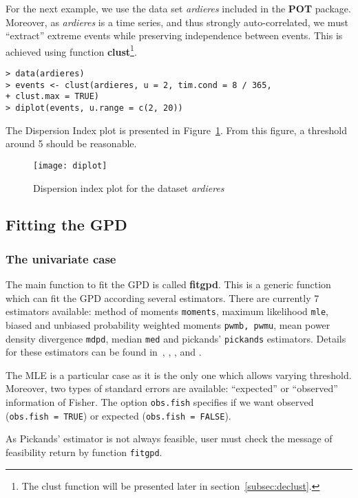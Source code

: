 \documentclass[11pt,a4paper]{article}
\numberwithin{equation}{section}
\theoremstyle{definition}
\begin{document}
For the next example, we use the data set \emph{ardieres} included in
the \textbf{POT} package. Moreover, as \emph{ardieres} is a time
series, and thus strongly auto-correlated, we must ``extract'' extreme
events while preserving independence between events. This is achieved
using function \textbf{clust}\footnote{The clust function will be
  presented later in section~\ref{subsec:declust}.}.
\begin{verbatim}
> data(ardieres)
> events <- clust(ardieres, u = 2, tim.cond = 8 / 365,
+ clust.max = TRUE)
> diplot(events, u.range = c(2, 20))
\end{verbatim}

The Dispersion Index plot is presented in
Figure~\ref{fig:diplot}. From this figure, a threshold around 5 should
be reasonable.

\begin{figure}
  \centering
  \texttt{[image: diplot]}
  \caption{Dispersion index plot for the dataset \emph{ardieres}}
  \label{fig:diplot}
\end{figure}

\subsection{Fitting the GPD}
\label{subsec:fitGPD}

\subsubsection{The univariate case}

The main function to fit the GPD is called \textbf{fitgpd}. This is a
generic function which can fit the GPD according several
estimators. There are currently 7 estimators available: method of
moments \verb|moments|, maximum likelihood \verb|mle|, biased and
unbiased probability weighted moments \verb|pwmb, pwmu|, mean power
density divergence \verb|mdpd|, median \verb|med| and pickands'
\verb|pickands| estimators. Details for these estimators can be found
in~\citep{Coles2001}, \citep{Hosking1987}, \citep{Juarez2004},
\citep{Peng2001} and \citep{Pickands1975}.

The MLE is a particular case as it is the only one which allows
varying threshold. Moreover, two types of standard errors are
available: ``expected'' or ``observed'' information of Fisher. The
option \verb|obs.fish| specifies if we want observed
(\verb|obs.fish = TRUE|) or expected (\verb|obs.fish = FALSE|).

As Pickands' estimator is not always feasible, user must check the
message of feasibility return by function \verb+fitgpd+.
\end{document}

